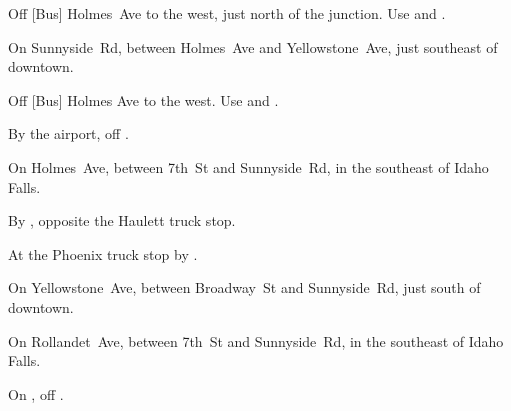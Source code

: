 
\begin{LocationList}

Off [Bus] Holmes~Ave to the west, just north of the  junction.
Use   and  .

On Sunnyside~Rd, between Holmes~Ave and Yellowstone~Ave, just southeast of downtown.

\Location{\GarageHQ \Garage \SpecialTransport}
Off [Bus] Holmes Ave to the west.
Use   and  .

By the airport, off  .

On Holmes~Ave, between 7th~St and Sunnyside~Rd, in the southeast of Idaho Falls.

By  , opposite the Haulett truck stop.

At the Phoenix truck stop by  .

On Yellowstone~Ave, between Broadway~St and Sunnyside~Rd, just south of downtown.

On Rollandet~Ave, between 7th~St and Sunnyside~Rd, in the southeast of Idaho Falls.

\Location{\RecruitmentAgency \Recruitment}
On , off  .


\end{LocationList}
